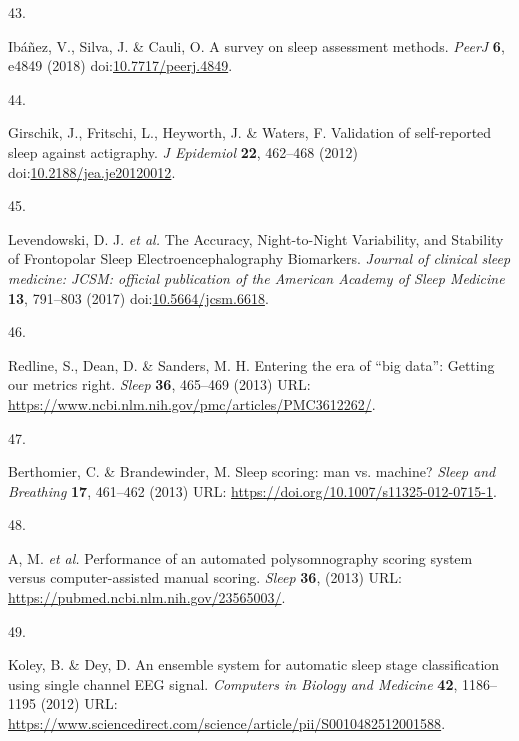 \documentclass[
  10pt,
]{scrbook}
\newlength{\cslhangindent}
\newlength{\csllabelwidth}
\newlength{\cslentryspacingunit} %
\newenvironment{CSLReferences}[2] %
 {%
  \setlength{\parindent}{0pt}
  \ifodd #1
  \let\oldpar\par
  \def\par{\hangindent=\cslhangindent\oldpar}
  \fi
  \setlength{\parskip}{#2\cslentryspacingunit}
 }%
 {}
\newcommand{\CSLLeftMargin}[1]{\parbox[t]{\csllabelwidth}{#1}}
\newcommand{\CSLRightInline}[1]{\parbox[t]{\linewidth - \csllabelwidth}{#1}\break}
\let\originaltextbf\textbf
\renewcommand{\textbf}[1]{\textcolor{color1}{\textsf{\originaltextbf{#1}}}}
\begin{document}
\begin{CSLReferences}{0}{0}
\leavevmode{}%
\CSLLeftMargin{43. }%
\CSLRightInline{Ibáñez, V., Silva, J. \& Cauli, O. A survey on sleep
assessment methods. \emph{PeerJ} \textbf{6}, e4849 (2018)
doi:\href{https://doi.org/10.7717/peerj.4849}{10.7717/peerj.4849}.}

\leavevmode{}%
\CSLLeftMargin{44. }%
\CSLRightInline{Girschik, J., Fritschi, L., Heyworth, J. \& Waters, F.
Validation of self-reported sleep against actigraphy. \emph{J Epidemiol}
\textbf{22}, 462--468 (2012)
doi:\href{https://doi.org/10.2188/jea.je20120012}{10.2188/jea.je20120012}.}

\leavevmode{}%
\CSLLeftMargin{45. }%
\CSLRightInline{Levendowski, D. J. \emph{et al.} The Accuracy,
Night-to-Night Variability, and Stability of Frontopolar Sleep
Electroencephalography Biomarkers. \emph{Journal of clinical sleep
medicine: JCSM: official publication of the American Academy of Sleep
Medicine} \textbf{13}, 791--803 (2017)
doi:\href{https://doi.org/10.5664/jcsm.6618}{10.5664/jcsm.6618}.}

\leavevmode{}%
\CSLLeftMargin{46. }%
\CSLRightInline{Redline, S., Dean, D. \& Sanders, M. H. Entering the era
of {``}big data{''}: Getting our metrics right. \emph{Sleep}
\textbf{36}, 465--469 (2013) URL:
\url{https://www.ncbi.nlm.nih.gov/pmc/articles/PMC3612262/}.}

\leavevmode{}%
\CSLLeftMargin{47. }%
\CSLRightInline{Berthomier, C. \& Brandewinder, M. Sleep scoring: man
vs. machine? \emph{Sleep and Breathing} \textbf{17}, 461--462 (2013)
URL: \url{https://doi.org/10.1007/s11325-012-0715-1}.}

\leavevmode{}%
\CSLLeftMargin{48. }%
\CSLRightInline{A, M. \emph{et al.} Performance of an automated
polysomnography scoring system versus computer-assisted manual scoring.
\emph{Sleep} \textbf{36}, (2013) URL:
\url{https://pubmed.ncbi.nlm.nih.gov/23565003/}.}

\leavevmode{}%
\CSLLeftMargin{49. }%
\CSLRightInline{Koley, B. \& Dey, D. An ensemble system for automatic
sleep stage classification using single channel EEG signal.
\emph{Computers in Biology and Medicine} \textbf{42}, 1186--1195 (2012)
URL:
\url{https://www.sciencedirect.com/science/article/pii/S0010482512001588}.}


\end{CSLReferences}
\end{document}
